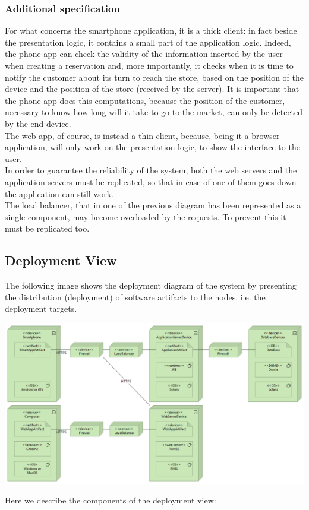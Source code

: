\subsubsection{Additional specification}
For what concerns the smartphone application, it is a thick client: in fact beside the presentation logic, it contains a small part of the application logic. Indeed, the phone app can check the validity of the information inserted by the user when creating a reservation and, more importantly, it checks when it is time to notify the customer about its turn to reach the store, based on the position of the device and the position of the store (received by the server). It is important that the phone app does this computations, because the position of the customer, necessary to know how long will it take to go to the market, can only be detected by the end device.\\
The web app, of course, is instead a thin client, because, being it a browser application, will only work on the presentation logic, to show the interface to the user.\\
In order to guarantee the reliability of the system, both the web servers and the application servers must be replicated, so that in case of one of them goes down the application can still work.\\
The load balancer, that in one of the previous diagram has been represented as a single component, may become overloaded by the requests. To prevent this it must be replicated too.
\subsection{Deployment View}
The following image shows the deployment diagram of the system by presenting the distribution (deployment) of software artifacts to the nodes, i.e. the deployment targets.
\begin{flushleft}
	\includegraphics[scale=0.45]{Images/Deployment.png}
\end{flushleft}
Here we describe the components of the deployment view:
